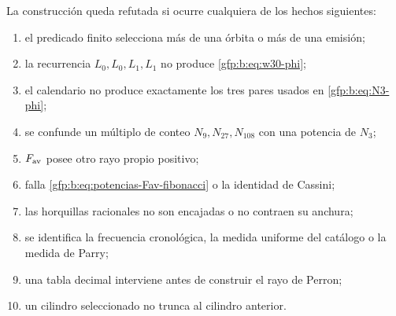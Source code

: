 \begin{remark}
La construcción queda refutada si ocurre cualquiera de los hechos
siguientes:
\begin{enumerate}
 \setlength{\itemsep}{0.15\baselineskip}
 \item el predicado finito selecciona más de una órbita o más de una emisión;
 \item la recurrencia \(L_0,L_0,L_1,L_1\) no produce
       \eqref{gfp:b:eq:w30-phi};
 \item el calendario no produce exactamente los tres pares usados en
       \eqref{gfp:b:eq:N3-phi};
 \item se confunde un múltiplo de conteo \(N_{9},N_{27},N_{108}\) con una
       potencia de \(N_3\);
 \item \(F_{\rm av}\) posee otro rayo propio positivo;
 \item falla \eqref{gfp:b:eq:potencias-Fav-fibonacci} o la identidad de Cassini;
 \item las horquillas racionales no son encajadas o no contraen su anchura;
 \item se identifica la frecuencia cronológica, la medida uniforme del
       catálogo o la medida de Parry;
 \item una tabla decimal interviene antes de construir el rayo de Perron;
 \item un cilindro seleccionado no trunca al cilindro anterior.
\end{enumerate}
\end{remark}
